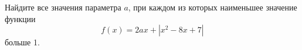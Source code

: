 \begin{ex}
	\begin{condition}
		Найдите все значения параметра \( a \), при каждом из которых наименьшее значение функции \[ f(x)=2ax+|x^2-8x+7| \] больше 1.
	\end{condition}
\end{ex}